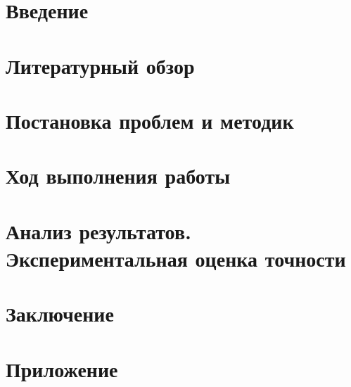 \documentclass[14pt,a4paper]{extarticle}
\begin{document}
\pagestyle{plain}
\clearpage
\newpage
\tableofcontents
\newpage
\section{Введение}

\section{Литературный обзор}

\section{Постановка проблем и методик}

%

\section{Ход выполнения работы}

\section{Анализ результатов. Экспериментальная оценка точности}

\section{Заключение}

\section{Приложение}

\end{document}
